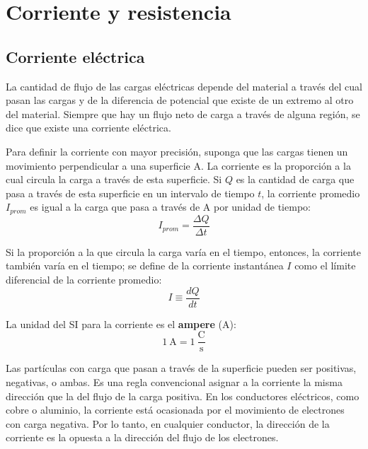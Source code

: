 \section{Corriente y resistencia}
  \subsection{Corriente eléctrica}
    \PN La cantidad de flujo de las cargas eléctricas depende del material a través del cual pasan las cargas y de la
    diferencia de potencial que existe de un extremo al otro del material. Siempre que hay un flujo neto de carga a
    través de alguna región, se dice que existe una corriente eléctrica.

    \PN Para definir la corriente con mayor precisión, suponga que las cargas tienen un movimiento perpendicular a una
    superficie A. La corriente es la proporción a la cual circula la carga a través de esta superficie. Si $Q$ es la
    cantidad de carga que pasa a través de esta superficie en un intervalo de tiempo $t$, la corriente promedio
    $I_{prom}$ es igual a la carga que pasa a través de A por unidad de tiempo:
    \begin{equation*}
      I_{prom} = \frac{\Delta Q}{\Delta t}
    \end{equation*}

    \PN Si la proporción a la que circula la carga varía en el tiempo, entonces, la corriente también varía en el
    tiempo; se define de la corriente instantánea $I$ como el límite diferencial de la corriente promedio:
    \begin{equation*}
      I \equiv \frac{dQ}{dt}
    \end{equation*}

    \PN La unidad del SI para la corriente es el \textbf{ampere} (A):
    \begin{equation*}
      1 \ \text{A} = 1 \ \frac{\text{C}}{\text{s}}
    \end{equation*}

    \PN Las partículas con carga que pasan a través de la superficie pueden ser positivas, negativas, o ambas. Es una
    regla convencional asignar a la corriente la misma dirección que la del flujo de la carga positiva. En los
    conductores eléctricos, como cobre o aluminio, la corriente está ocasionada por el movimiento de electrones con
    carga negativa. Por lo tanto, en cualquier conductor, la dirección de la corriente es la opuesta a la dirección del
    flujo de los electrones.

